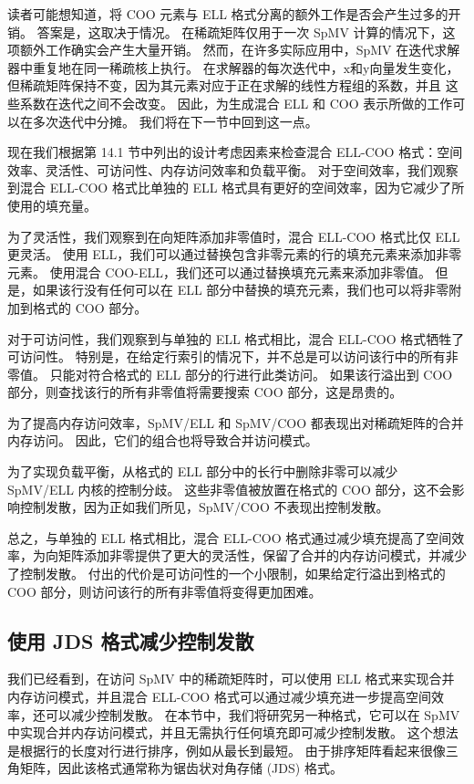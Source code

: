读者可能想知道，将 COO 元素与 ELL 格式分离的额外工作是否会产生过多的开销。 答案是，这取决于情况。 在稀疏矩阵仅用于一次 SpMV 计算的情况下，这项额外工作确实会产生大量开销。 然而，在许多实际应用中，SpMV 在迭代求解器中重复地在同一稀疏核上执行。 在求解器的每次迭代中，$\mathrm{x}$和$\mathrm{y}$向量发生变化，但稀疏矩阵保持不变，因为其元素对应于正在求解的线性方程组的系数，并且 这些系数在迭代之间不会改变。 因此，为生成混合 ELL 和 COO 表示所做的工作可以在多次迭代中分摊。 我们将在下一节中回到这一点。

现在我们根据第 14.1 节中列出的设计考虑因素来检查混合 ELL-COO 格式：空间效率、灵活性、可访问性、内存访问效率和负载平衡。 对于空间效率，我们观察到混合 ELL-COO 格式比单独的 ELL 格式具有更好的空间效率，因为它减少了所使用的填充量。

为了灵活性，我们观察到在向矩阵添加非零值时，混合 ELL-COO 格式比仅 ELL 更灵活。 使用 ELL，我们可以通过替换包含非零元素的行的填充元素来添加非零元素。 使用混合 COO-ELL，我们还可以通过替换填充元素来添加非零值。 但是，如果该行没有任何可以在 ELL 部分中替换的填充元素，我们也可以将非零附加到格式的 COO 部分。

对于可访问性，我们观察到与单独的 ELL 格式相比，混合 ELL-COO 格式牺牲了可访问性。 特别是，在给定行索引的情况下，并不总是可以访问该行中的所有非零值。 只能对符合格式的 ELL 部分的行进行此类访问。 如果该行溢出到 $\mathrm{COO}$ 部分，则查找该行的所有非零值将需要搜索 $\mathrm{COO}$ 部分，这是昂贵的。

为了提高内存访问效率，SpMV/ELL 和 SpMV/COO 都表现出对稀疏矩阵的合并内存访问。 因此，它们的组合也将导致合并访问模式。

为了实现负载平衡，从格式的 ELL 部分中的长行中删除非零可以减少 SpMV/ELL 内核的控制分歧。 这些非零值被放置在格式的 $\mathrm{COO}$ 部分，这不会影响控制发散，因为正如我们所见，SpMV/COO 不表现出控制发散。

总之，与单独的 ELL 格式相比，混合 ELL-COO 格式通过减少填充提高了空间效率，为向矩阵添加非零提供了更大的灵活性，保留了合并的内存访问模式，并减少了控制发散。 付出的代价是可访问性的一个小限制，如果给定行溢出到格式的 $\mathrm{COO}$ 部分，则访问该行的所有非零值将变得更加困难。

\subsection{使用 JDS 格式减少控制发散}
我们已经看到，在访问 SpMV 中的稀疏矩阵时，可以使用 ELL 格式来实现合并内存访问模式，并且混合 ELL-COO 格式可以通过减少填充进一步提高空间效率，还可以减少控制发散。 在本节中，我们将研究另一种格式，它可以在 SpMV 中实现合并内存访问模式，并且无需执行任何填充即可减少控制发散。 这个想法是根据行的长度对行进行排序，例如从最长到最短。 由于排序矩阵看起来很像三角矩阵，因此该格式通常称为锯齿状对角存储 (JDS) 格式。

